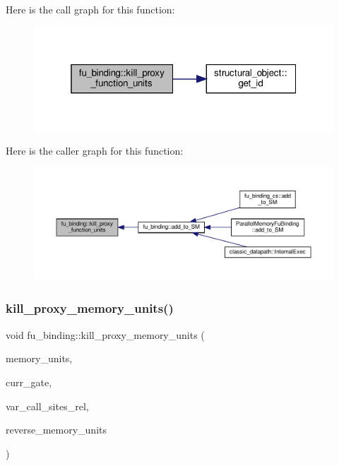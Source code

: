 Here is the call graph for this function\+:
\nopagebreak
\begin{figure}[H]
\begin{center}
\leavevmode
\includegraphics[width=319pt]{d8/d04/classfu__binding_a0c1d997736c70885bf9fcd71ac1c5a16_cgraph}
\end{center}
\end{figure}
Here is the caller graph for this function\+:
\nopagebreak
\begin{figure}[H]
\begin{center}
\leavevmode
\includegraphics[width=350pt]{d8/d04/classfu__binding_a0c1d997736c70885bf9fcd71ac1c5a16_icgraph}
\end{center}
\end{figure}
\mbox{\label{classfu__binding_a2095e3ec75e968aeaffab65eab0ca654}} 
\subsubsection{\texorpdfstring{kill\+\_\+proxy\+\_\+memory\+\_\+units()}{kill\_proxy\_memory\_units()}}
{\footnotesize\ttfamily void fu\+\_\+binding\+::kill\+\_\+proxy\+\_\+memory\+\_\+units (\begin{DoxyParamCaption}\item[{std\+::map$<$ unsigned int, unsigned int $>$ \&}]{memory\+\_\+units,  }\item[{\hyperlink{structural__objects_8hpp_a8ea5f8cc50ab8f4c31e2751074ff60b2}{structural\+\_\+object\+Ref}}]{curr\+\_\+gate,  }\item[{std\+::map$<$ unsigned int, std\+::list$<$ \hyperlink{structural__objects_8hpp_a8ea5f8cc50ab8f4c31e2751074ff60b2}{structural\+\_\+object\+Ref} $>$$>$ \&}]{var\+\_\+call\+\_\+sites\+\_\+rel,  }\item[{std\+::map$<$ unsigned int, unsigned int $>$ \&}]{reverse\+\_\+memory\+\_\+units }\end{DoxyParamCaption})\hspace{0.3cm}{\ttfamily [protected]}}



